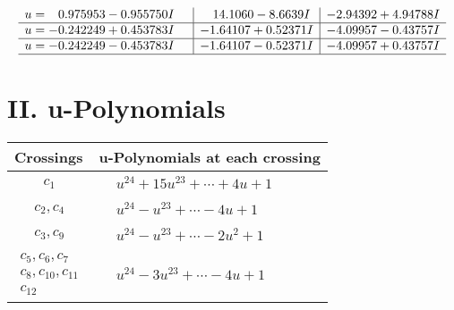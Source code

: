 \documentclass[1p]{elsarticle_modified}
\theoremstyle{definition}
\begin{document}
$$\begin{array}{c|c|c}
\begin{aligned}
u &= \phantom{-}0.975953 - 0.955750 I\end{aligned}
 & \phantom{-}14.1060 - 8.6639 I & -2.94392 + 4.94788 I \\ \hline\begin{aligned}
u &= -0.242249 + 0.453783 I\end{aligned}
 & -1.64107 + 0.52371 I & -4.09957 - 0.43757 I \\ \hline\begin{aligned}
u &= -0.242249 - 0.453783 I\end{aligned}
 & -1.64107 - 0.52371 I & -4.09957 + 0.43757 I\\
 \hline 
 \end{array}$$\newpage
\newpage\renewcommand{\arraystretch}{1}
\centering \section*{ II. u-Polynomials}
\begin{tabular}{m{50pt}|m{274pt}}
Crossings & \hspace{64pt}u-Polynomials at each crossing \\
\hline $$\begin{aligned}c_{1}\end{aligned}$$&$\begin{aligned}
&u^{24}+15 u^{23}+\cdots+4 u+1
\end{aligned}$\\
\hline $$\begin{aligned}c_{2},c_{4}\end{aligned}$$&$\begin{aligned}
&u^{24}- u^{23}+\cdots-4 u+1
\end{aligned}$\\
\hline $$\begin{aligned}c_{3},c_{9}\end{aligned}$$&$\begin{aligned}
&u^{24}- u^{23}+\cdots-2 u^2+1
\end{aligned}$\\
\hline $$\begin{aligned}c_{5},c_{6},c_{7}\\c_{8},c_{10},c_{11}\\c_{12}\end{aligned}$$&$\begin{aligned}
&u^{24}-3 u^{23}+\cdots-4 u+1
\end{aligned}$\\
\hline
\end{tabular}\newpage\renewcommand{\arraystretch}{1}
\end{document}

